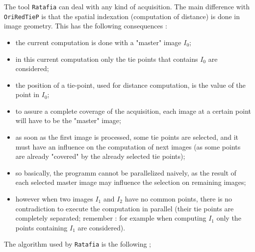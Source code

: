 The tool {\tt Ratafia} can deal with any kind of acquisition. The main difference with
{\tt OriRedTieP} is that the spatial indexation (computation of distance) is done in image geometry.
This has the following consequences :

\begin{itemize}
   \item the current computation  is done with a "master" image $I_0$;

   \item in this current computation  only the tie points that contains $I_0$ are considered;

   \item the position of a tie-point, used for distance computation, is the value of the point in $I_0$;

   \item to assure a complete coverage of the acquisition, each image at a certain point  will have to be the "master" image;

   \item as soon as the first image is processed,  some tie points are selected, and it must have an influence on 
         the computation of next images (as some points are already "covered" by the already selected tie points);

   \item so basically, the programm cannot be parallelized naively, as the result of each selected master
         image may influence the selection on remaining images;

   \item however when two images $I_1$ and $I_2$ have no common points, there is no contradiction to execute the computation
         in parallel  (their tie points are completely separated; remember : for example when computing $I_1$ only the points 
         containing $I_1$ are considered).
\end{itemize}

The algorithm used by  {\tt Ratafia}  is the following ;

